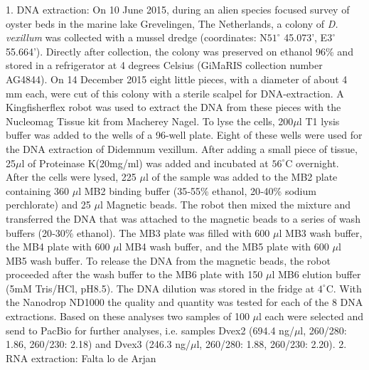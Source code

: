 1. DNA extraction:
On 10 June 2015, during an alien species focused survey of oyster beds in the marine lake Grevelingen, The Netherlands, a colony of \textit{D. vexillum} was collected with a mussel dredge (coordinates: N$51^\circ$ 45.073’, E$3^\circ$ 55.664’). Directly after collection, the colony was preserved on ethanol 96\% and stored in a refrigerator at 4 degrees Celsius (GiMaRIS collection number AG4844). On 14 December 2015 eight little pieces, with a diameter of about 4 mm each, were cut of this colony with a sterile scalpel for DNA-extraction. A Kingfisherflex robot was used to extract the DNA from these pieces with the Nucleomag Tissue kit from Macherey Nagel. To lyse the cells, 200$\mu$l T1 lysis buffer was added to the wells of a 96-well plate. Eight of these wells were used for the DNA extraction of Didemnum vexillum. After adding a small piece of tissue, 25$\mu$l of Proteinase K(20mg/ml) was added and incubated at $56^\circ$C overnight. After the cells were lysed, 225 $\mu$l of the sample was added to the MB2 plate containing 360 $\mu$l MB2 binding buffer (35‐55\% ethanol, 20‐40\% sodium perchlorate) and 25 $\mu$l Magnetic beads. The robot then mixed the mixture and transferred the DNA that was attached to the magnetic beads to a series of wash buffers (20‐30\% ethanol). The MB3 plate was filled with 600 $\mu$l MB3 wash buffer, the MB4 plate with 600 $\mu$l MB4 wash buffer, and the MB5 plate with 600 $\mu$l MB5 wash buffer. To release the DNA from the magnetic beads, the robot proceeded after the wash buffer to the MB6 plate with 150 $\mu$l MB6 elution buffer (5mM Tris/HCl, pH8.5). The DNA dilution was stored in the fridge at $4^\circ$C. With the Nanodrop ND1000 the quality and quantity was tested for each of the 8 DNA extractions. Based on these analyses two samples of 100 $\mu$l each were selected and send to PacBio for further analyses, i.e. samples Dvex2 (694.4 ng/$\mu$l, 260/280: 1.86, 260/230: 2.18) and Dvex3 (246.3 ng/$\mu$l, 260/280: 1.88, 260/230: 2.20).
2. RNA extraction:
Falta lo de Arjan


